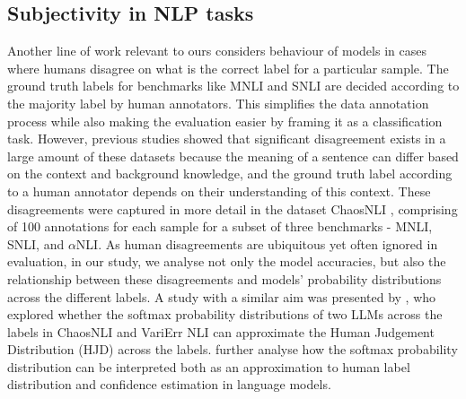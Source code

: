 

\subsection{Subjectivity in NLP tasks}
\label{related:subjectivity}
Another line of work relevant to ours considers behaviour of models in cases where humans disagree on what is the correct label for a particular sample. 
% 
The ground truth labels for benchmarks like MNLI and SNLI are decided according to the majority label by human annotators. 
This simplifies the data annotation process while also making the evaluation easier by framing it as a classification task. 
However, previous studies \citep{pavlick-kwiatkowski-2019-inherent, nie-etal-2020-learn} showed that significant disagreement exists in a large amount of these datasets because the meaning of a sentence can differ based on the context and background knowledge, and the ground truth label according to a human annotator depends on their understanding of this context. 
These disagreements were captured in more detail in the dataset ChaosNLI \citet{nie-etal-2020-learn}, comprising of 100 annotations for each sample for a subset of three benchmarks - MNLI, SNLI, and $\alpha$NLI.
As human disagreements are ubiquitous yet often ignored in evaluation, in our study, we analyse not only the model accuracies, but also the relationship between these disagreements and models' probability distributions across the different labels.
A study with a similar aim was presented by \citet{chen2024seeingbig}, who explored whether the softmax probability distributions of two LLMs across the labels in ChaosNLI and VariErr NLI \citep{weber-genzel-etal-2024-varierr} can approximate the Human Judgement Distribution (HJD) across the labels. 
\citet{baan-etal-2024-interpreting} further analyse how the softmax probability distribution can be interpreted both as an approximation to human label distribution and confidence estimation in language models.


